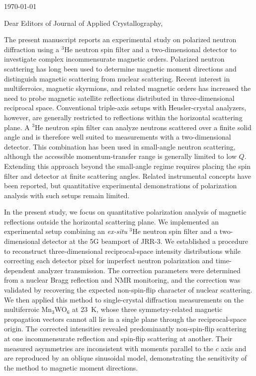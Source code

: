 \documentclass[11pt,a4paper]{article}
\newcommand{\LetterDate}{\today}
\newcommand{\JournalName}{Journal of Applied Crystallography}
\begin{document}
{\raggedleft \LetterDate\par}
\vspace{5pt}
\noindent Dear Editors of \JournalName,

The present manuscript reports an experimental study on polarized neutron diffraction using a $^3$He neutron spin filter and a two-dimensional detector to investigate complex incommensurate magnetic orders.
Polarized neutron scattering has long been used to determine magnetic moment directions and distinguish magnetic scattering from nuclear scattering.
Recent interest in multiferroics, magnetic skyrmions, and related magnetic orders has increased the need to probe magnetic satellite reflections distributed in three-dimensional reciprocal space.
Conventional triple-axis setups with Heusler-crystal analyzers, however, are generally restricted to reflections within the horizontal scattering plane.
A $^3$He neutron spin filter can analyze neutrons scattered over a finite solid angle and is therefore well suited to measurements with a two-dimensional detector.
This combination has been used in small-angle neutron scattering, although the accessible momentum-transfer range is generally limited to low $Q$.
Extending this approach beyond the small-angle regime requires placing the spin filter and detector at finite scattering angles.
Related instrumental concepts have been reported, but quantitative experimental demonstrations of polarization analysis with such setups remain limited.

In the present study, we focus on quantitative polarization analysis of magnetic reflections outside the horizontal scattering plane.
We implemented an experimental setup combining an \textit{ex-situ} $^3$He neutron spin filter and a two-dimensional detector at the 5G beamport of JRR-3.
We established a procedure to reconstruct three-dimensional reciprocal-space intensity distributions while correcting each detector pixel for imperfect neutron polarization and time-dependent analyzer transmission.
The correction parameters were determined from a nuclear Bragg reflection and NMR monitoring, and the correction was validated by recovering the expected non-spin-flip character of nuclear scattering.
We then applied this method to single-crystal diffraction measurements on the multiferroic Mn$_3$WO$_6$ at 23~K, whose three symmetry-related magnetic propagation vectors cannot all lie in a single plane through the reciprocal-space origin.
The corrected intensities revealed predominantly non-spin-flip scattering at one incommensurate reflection and spin-flip scattering at another.
Their measured asymmetries are inconsistent with moments parallel to the $c$ axis and are reproduced by an oblique sinusoidal model, demonstrating the sensitivity of the method to magnetic moment directions.
\end{document}
